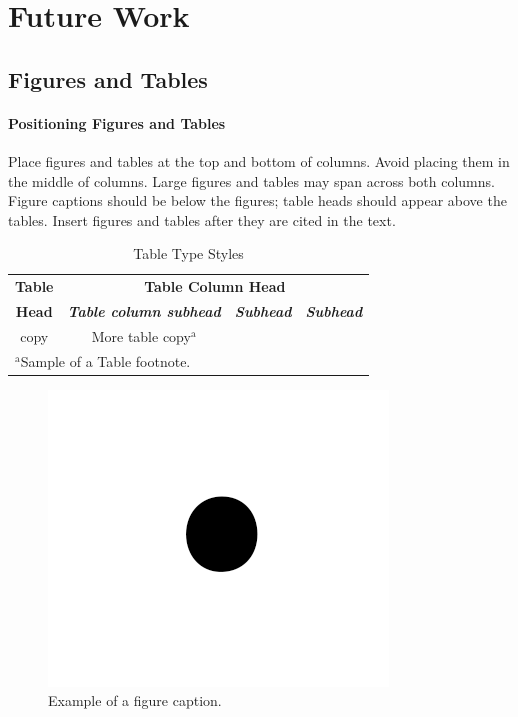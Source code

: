 \documentclass[conference]{IEEEtran}
\begin{document}
\section{Future Work}


\subsection{Figures and Tables}
\paragraph{Positioning Figures and Tables} Place figures and tables at the top and 
bottom of columns. Avoid placing them in the middle of columns. Large 
figures and tables may span across both columns. Figure captions should be 
below the figures; table heads should appear above the tables. Insert 
figures and tables after they are cited in the text.

\begin{table}[htbp]
\caption{Table Type Styles}
\begin{center}
\begin{tabular}{|c|c|c|c|}
\hline
\textbf{Table}&\multicolumn{3}{|c|}{\textbf{Table Column Head}} \\
\cline{2-4} 
\textbf{Head} & \textbf{\textit{Table column subhead}}& \textbf{\textit{Subhead}}& \textbf{\textit{Subhead}} \\
\hline
copy& More table copy$^{\mathrm{a}}$& &  \\
\hline
\multicolumn{4}{l}{$^{\mathrm{a}}$Sample of a Table footnote.}
\end{tabular}
\label{tab1}
\end{center}
\end{table}

\begin{figure}[htbp]
\centerline{\includegraphics{fig1.png}}
\caption{Example of a figure caption.}
\label{fig}
\end{figure}
\end{document}
